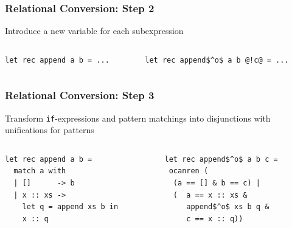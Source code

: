 \documentclass[xcolor=table]{beamer}
\begin{document}
\begin{frame}[fragile]
  \transwipe[direction=90]
  \frametitle{Relational Conversion: Step 2}
\begin{center}
Introduce a new variable for each subexpression
\end{center}

\begin{columns}
\begin{column}{0.5\textwidth}
\begin{lstlisting}
let rec append a b = ...
\end{lstlisting}
\end{column}
\begin{column}{0.5\textwidth}
\begin{lstlisting}
let rec append$^o$ a b @!c@ = ...
\end{lstlisting}
\end{column}
\end{columns}
\end{frame}

\begin{frame}[fragile]
  \transwipe[direction=90]
  \frametitle{Relational Conversion: Step 3}

\begin{center}
Transform \lstinline{if}-expressions and pattern matchings into disjunctions with unifications for patterns
\end{center}

\begin{columns}
\begin{column}{0.5\textwidth}
\begin{lstlisting}
let rec append a b =
  match a with
  | []      -> b
  | x :: xs ->
    let q = append xs b in
    x :: q
\end{lstlisting}
\end{column}
\begin{column}{0.5\textwidth}
\begin{lstlisting}
let rec append$^o$ a b c =
 ocanren (
  (a == [] & b == c) |
  (  a == x :: xs &
     append$^o$ xs b q &
     c == x :: q))
\end{lstlisting}
\end{column}
\end{columns}
\end{frame}
\end{document}

